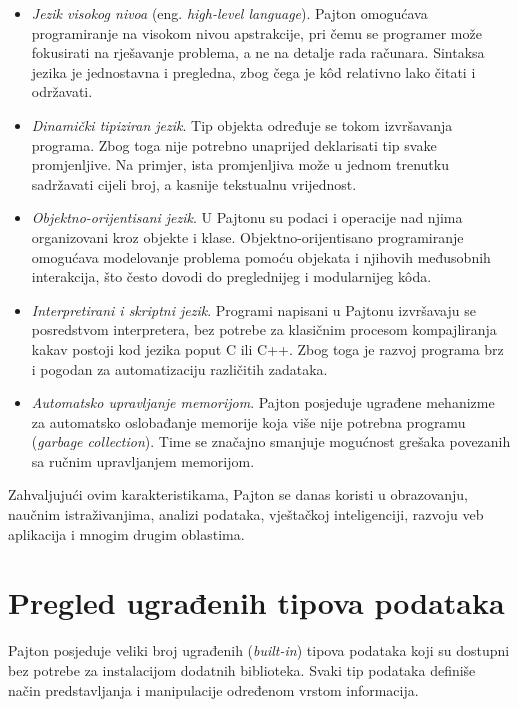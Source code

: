 \begin{itemize}
	\item \textit{Jezik visokog nivoa} (eng. \textit{high-level language}). Pajton omogućava programiranje na visokom nivou apstrakcije, pri čemu se programer može fokusirati na rješavanje problema, a ne na detalje rada računara. Sintaksa jezika je jednostavna i pregledna, zbog čega je k\^od relativno lako čitati i održavati.
	
	\item \textit{Dinamički tipiziran jezik}. Tip objekta određuje se tokom izvršavanja programa. Zbog toga nije potrebno unaprijed deklarisati tip svake promjenljive. Na primjer, ista promjenljiva može u jednom trenutku sadržavati cijeli broj, a kasnije tekstualnu vrijednost.
	
	\item \textit{Objektno-orijentisani jezik}. U Pajtonu su podaci i operacije nad njima organizovani kroz objekte i klase. Objektno-orijentisano programiranje omogućava modelovanje problema pomoću objekata i njihovih međusobnih interakcija, što često dovodi do preglednijeg i modularnijeg k\^oda.
	
	\item \textit{Interpretirani i skriptni jezik}. Programi napisani u Pajtonu izvršavaju se posredstvom interpretera, bez potrebe za klasičnim procesom kompajliranja kakav postoji kod jezika poput C ili C++. Zbog toga je razvoj programa brz i pogodan za automatizaciju različitih zadataka.
	
	\item \textit{Automatsko upravljanje memorijom}. Pajton posjeduje ugrađene mehanizme za automatsko oslobađanje memorije koja više nije potrebna programu (\textit{garbage collection}). Time se značajno smanjuje mogućnost grešaka povezanih sa ručnim upravljanjem memorijom.

\end{itemize}

Zahvaljujući ovim karakteristikama, Pajton se danas koristi u obrazovanju, naučnim istraživanjima, analizi podataka, vještačkoj inteligenciji, razvoju veb aplikacija i mnogim drugim oblastima.

\section{Pregled ugrađenih tipova podataka}

Pajton posjeduje veliki broj ugrađenih (\textit{built-in}) tipova podataka koji su dostupni bez potrebe za instalacijom dodatnih biblioteka. Svaki tip podataka definiše način predstavljanja i manipulacije određenom vrstom informacija.

